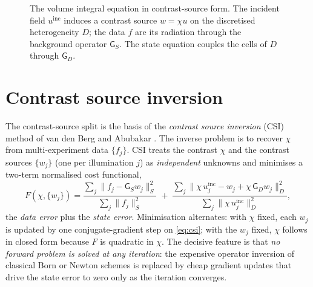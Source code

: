 \documentclass[11pt,a4paper]{article}
\newcommand{\uinc}{u^{\mathrm{inc}}}
\newcommand{\Gop}{\mathsf{G}}
\newcommand{\norm}[1]{\lVert #1 \rVert}
\begin{document}
\begin{figure}[h]
\centering
{}
\caption{The volume integral equation in contrast-source form. The incident field $\uinc$
induces a contrast source $w=\chi u$ on the discretised heterogeneity $D$; the data $f$ are its
radiation through the background operator $\Gop_S$. The state equation couples the cells of $D$
through $\Gop_D$.}
\end{figure}

\section{Contrast source inversion}

The contrast-source split is the basis of the \emph{contrast source inversion} (CSI) method of
van den Berg and Abubakar \cite{vdBKleinman1997,vdBBroekhovenAbubakar1999,vdBAbubakar2001}. The
inverse problem is to recover $\chi$ from multi-experiment data $\{f_j\}$. CSI treats the
contrast $\chi$ and the contrast sources $\{w_j\}$ (one per illumination $j$) as
\emph{independent} unknowns and minimises a two-term normalised cost functional,
\begin{equation}
\label{eq:csi}
F(\chi,\{w_j\})=
\frac{\sum_j \norm{f_j-\Gop_S w_j}_S^2}{\sum_j \norm{f_j}_S^2}
\;+\;
\frac{\sum_j \norm{\chi\,\uinc_j-w_j+\chi\,\Gop_D w_j}_D^2}{\sum_j \norm{\chi\,\uinc_j}_D^2},
\end{equation}
the \emph{data error} plus the \emph{state error}. Minimisation alternates: with $\chi$ fixed,
each $w_j$ is updated by one conjugate-gradient step on \eqref{eq:csi}; with the $w_j$ fixed,
$\chi$ follows in closed form because $F$ is quadratic in $\chi$. The decisive feature is that
\emph{no forward problem is solved at any iteration}: the expensive operator inversion of
classical Born or Newton schemes is replaced by cheap gradient updates that drive the state
error to zero only as the iteration converges.
\end{document}
